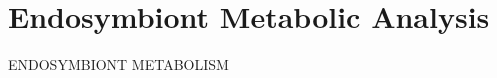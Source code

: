 \graphicspath{{chapters/6.Chapter_4/figures}}

\chapter{Endosymbiont Metabolic Analysis}

ENDOSYMBIONT METABOLISM
